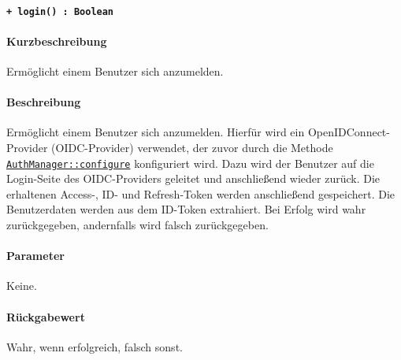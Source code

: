 \paragraph{\texttt{+ login() : Boolean}}\label{AP_AuthManager_login}%
\paragraph*{Kurzbeschreibung}
Ermöglicht einem Benutzer sich anzumelden.
\paragraph*{Beschreibung}
Ermöglicht einem Benutzer sich anzumelden.
Hierfür wird ein OpenIDConnect-Provider (OIDC-Provider) verwendet, der zuvor durch die Methode \hyperref[AP_AuthManager_configure]{\texttt{AuthManager::configure}} konfiguriert wird.
Dazu wird der Benutzer auf die Login-Seite des OIDC-Providers geleitet und anschließend wieder zurück.
Die erhaltenen Access-, ID- und Refresh-Token werden anschließend gespeichert.
Die Benutzerdaten werden aus dem ID-Token extrahiert.
Bei Erfolg wird wahr zurückgegeben, andernfalls wird falsch zurückgegeben.
\paragraph*{Parameter}
Keine.
\paragraph*{Rückgabewert}
Wahr, wenn erfolgreich, falsch sonst.
